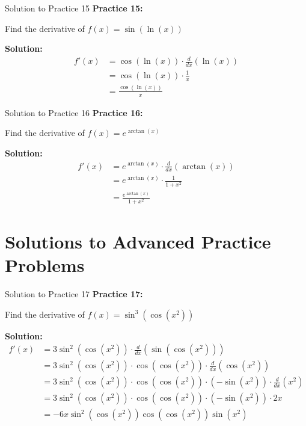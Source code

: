 \documentclass[aspectratio=169]{beamer}
\begin{document}
\begin{frame}{Solution to Practice 15}
\textbf{Practice 15:}

Find the derivative of $f(x) = \sin(\ln(x))$

\textbf{Solution:}
\[
\begin{aligned}
  f'(x) &= \cos(\ln(x)) \cdot \frac{d}{dx}(\ln(x)) \\
  &= \cos(\ln(x)) \cdot \frac{1}{x} \\
  &= \frac{\cos(\ln(x))}{x}
\end{aligned}
\]
\end{frame}

\begin{frame}{Solution to Practice 16}
\textbf{Practice 16:}

Find the derivative of $f(x) = e^{\arctan(x)}$

\textbf{Solution:}
\[
\begin{aligned}
  f'(x) &= e^{\arctan(x)} \cdot \frac{d}{dx}(\arctan(x)) \\
  &= e^{\arctan(x)} \cdot \frac{1}{1 + x^2} \\
  &= \frac{e^{\arctan(x)}}{1 + x^2}
\end{aligned}
\]
\end{frame}

\section{Solutions to Advanced Practice Problems}

\begin{frame}{Solution to Practice 17}
\textbf{Practice 17:}

Find the derivative of $f(x) = \sin^3(\cos(x^2))$

\textbf{Solution:}
\[
\begin{aligned}
  f'(x) &= 3\sin^2(\cos(x^2)) \cdot \frac{d}{dx}(\sin(\cos(x^2))) \\
  &= 3\sin^2(\cos(x^2)) \cdot \cos(\cos(x^2)) \cdot \frac{d}{dx}(\cos(x^2)) \\
  &= 3\sin^2(\cos(x^2)) \cdot \cos(\cos(x^2)) \cdot (-\sin(x^2)) \cdot \frac{d}{dx}(x^2) \\
  &= 3\sin^2(\cos(x^2)) \cdot \cos(\cos(x^2)) \cdot (-\sin(x^2)) \cdot 2x \\
  &= -6x\sin^2(\cos(x^2))\cos(\cos(x^2))\sin(x^2)
\end{aligned}
\]
\end{frame}
\end{document}
